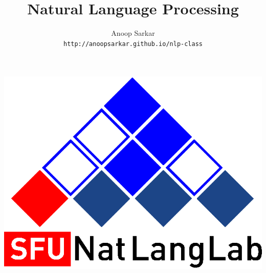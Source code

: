 
\title{\color{blue}Natural Language Processing}

\author{Anoop Sarkar \\ {\tt http://anoopsarkar.github.io/nlp-class}}
\institute{}
     
{
\addtocounter{framenumber}{-1}
\begin{frame}
\begin{center}
\vspace{1cm}
\includegraphics[scale=0.4]{figures/natlang-cky-logo.eps}
\end{center}
\titlepage
\end{frame}
}

